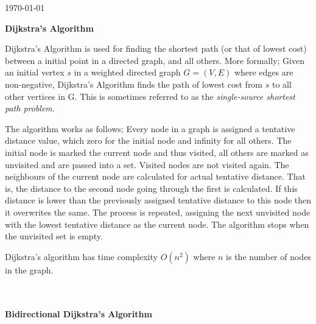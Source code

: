 \documentclass[paper=a4, fontsize=11pt]{scrartcl} %
\begin{document}
\begin{titlepage}

\vspace{5cm}

{\large \today}\\[3cm] %

\vfill %

\end{titlepage}
\clearpage
\twocolumn
\setlength{\parindent}{10ex}
{\bf \noindent Dijkstra's Algorithm}
{\par \noindent  Dijkstra's Algorithm is used for finding the shortest path (or that of lowest cost) between a initial point in a directed graph, and all others. More formally; Given an initial vertex $s$ in a weighted directed graph $G = (V,E)$ where edges are non-negative, Dijkstra's Algorithm finds the path of lowest cost from $s$ to all other vertices in G. This is sometimes referred to as the {\it single-source shortest path problem}. 
\par The algorithm works as follows; Every node in a graph is assigned a tentative distance value, which zero for the initial node and infinity for all others. The initial node is marked the current node and thus visited, all others are marked as unvisited and are passed into a set. Visited nodes are not visited again. The neighbours of the current node are calculated for actual tentative distance. That is, the distance to the second node going through the first is calculated. If this distance is lower than the previously assigned tentative distance to this node then it overwrites the same. The process is repeated, assigning the next unvisited node with the lowest tentative distance as the current node. The algorithm stops when the unvisited set is empty.
\par Dijkstra's algorithm has time complexity $O(n^2)$ where $n$ is the number of nodes in the graph. }\\\\
{\bf Bidirectional Dijkstra's Algorithm}\\
\end{document}
